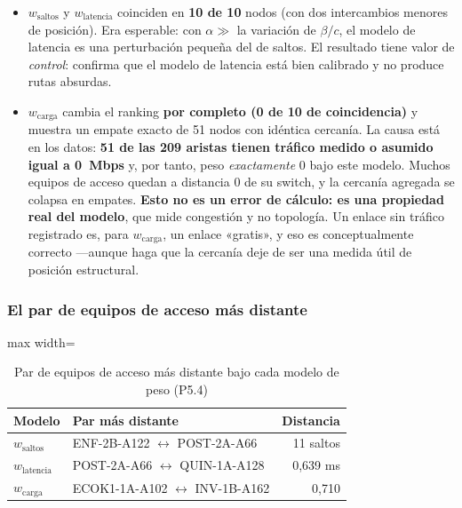 \documentclass[10pt,a4paper]{extarticle}
\begin{document}
\begin{itemize}[leftmargin=*,itemsep=1.5mm]
\item $w_{\text{saltos}}$ y $w_{\text{latencia}}$ coinciden en \textbf{10 de 10} nodos
(con dos intercambios menores de posición). Era esperable: con $\alpha \gg$ la variación de
$\beta/c$, el modelo de latencia es una perturbación pequeña del de saltos. El resultado
tiene valor de \textit{control}: confirma que el modelo de latencia está bien calibrado y no
produce rutas absurdas.

\item $w_{\text{carga}}$ cambia el ranking \textbf{por completo (0 de 10 de coincidencia)} y
muestra un empate exacto de 51 nodos con idéntica cercanía. La causa está en los datos:
\textbf{51 de las 209 aristas tienen tráfico medido o asumido igual a 0~Mbps} y, por tanto,
peso \textit{exactamente} 0 bajo este modelo. Muchos equipos de acceso quedan a distancia 0
de su switch, y la cercanía agregada se colapsa en empates. \textbf{Esto no es un error de
cálculo: es una propiedad real del modelo}, que mide congestión y no topología. Un enlace
sin tráfico registrado es, para $w_{\text{carga}}$, un enlace «gratis», y eso es
conceptualmente correcto ---aunque haga que la cercanía deje de ser una medida útil de
posición estructural.
\end{itemize}

\subsubsection{El par de equipos de acceso más distante}

\begin{table}[H]
\centering
\caption{Par de equipos de acceso más distante bajo cada modelo de peso (P5.4)}
\label{tab:pardistante}
\small
\begin{adjustbox}{max width=\textwidth}
\begin{tabular}{llr}
\toprule
\textbf{Modelo} & \textbf{Par más distante} & \textbf{Distancia} \\
\midrule
$w_{\text{saltos}}$   & ENF-2B-A122 $\leftrightarrow$ POST-2A-A66   & 11 saltos \\
$w_{\text{latencia}}$ & POST-2A-A66 $\leftrightarrow$ QUIN-1A-A128  & 0,639 ms \\
$w_{\text{carga}}$    & ECOK1-1A-A102 $\leftrightarrow$ INV-1B-A162 & 0,710 \\
\bottomrule
\end{tabular}
\end{adjustbox}
\end{table}
\end{document}
